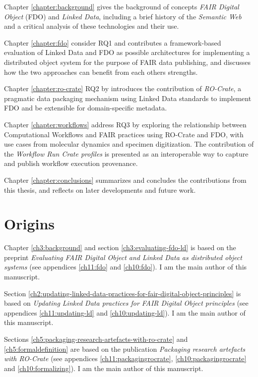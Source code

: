 Chapter \vref{chapter:background} gives the background of concepts \emph{FAIR Digital Object} (FDO) and \emph{Linked Data}, including a brief history of the \emph{Semantic Web} and a critical analysis of these technologies and their use. 

Chapter \vref{chapter:fdo} consider RQ1 and contributes a framework-based evaluation of Linked Data and FDO as possible architectures for implementing a distributed object system for the purpose of FAIR data publishing, and discusses how the two approaches can benefit from each others strengths. 

Chapter \vref{chapter:ro-crate} RQ2 by introduces the contribution of \emph{RO-Crate}, a pragmatic data packaging mechanism using Linked Data standards to implement FDO and be extensible for domain-specific metadata.  

Chapter \vref{chapter:workflows} address RQ3 by exploring the relationship between Computational Workflows and FAIR practices using RO-Crate and FDO, with use cases from molecular dynamics and specimen digitization. The contribution of the \emph{Workflow Run Crate profiles} is presented as an interoperable way to capture and publish workflow execution provenance. 

Chapter \vref{chapter:conclusions} summarizes and concludes the contributions from this thesis, and reflects on later developments and future work.


\section{Origins}

Chapter \ref{ch3:background} and section \ref{ch3:evaluating-fdo-ld} is based on the preprint \emph{Evaluating FAIR Digital Object and Linked Data as distributed object systems} \cite{soilandreyes2023c}  (see appendices \vref{ch11:fdo} and \vref{ch10:fdo}). I am the main author of this manuscript.

Section \ref{ch2:updating-linked-data-practices-for-fair-digital-object-principles} is based on \emph{Updating Linked Data practices for FAIR Digital Object principles} \cite{10.3897/rio.8.e94501} (see appendices \ref{ch11:updating-ld} and \ref{ch10:updating-ld}). I am the main author of this manuscript.

Sections \ref{ch5:packaging-research-artefacts-with-ro-crate} and \vref{ch5:formaldefinition} are based on the publication \emph{Packaging research artefacts with RO-Crate} \cite{Soiland-Reyes 2022} (see appendices \ref{ch11:packagingrocrate}, \ref{ch10:packagingrocrate} and \ref{ch10:formalizing}). I am the main author of this manuscript.

